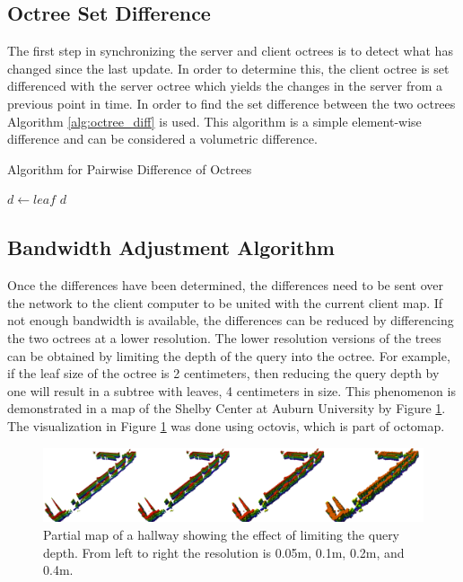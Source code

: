 \documentclass[12pt]{report}
\begin{document}
\subsection{Octree Set Difference}
The first step in synchronizing the server and client octrees is to detect what has changed since the last update. In order to determine this, the client octree is set differenced with the server octree which yields the changes in the server from a previous point in time. In order to find the set difference between the two octrees Algorithm \ref{alg:octree_diff} is used. This algorithm is a simple element-wise difference and can be considered a volumetric difference.

\begin{algorithm}
\caption{Algorithm for Pairwise Difference of Octrees}
\label{alg:octree_diff}
\begin{algorithmic}
  \STATE {}
  \STATE {}
  \STATE {}
      \STATE $d\gets leaf$
    \ENDIF
  \ENDFOR
  \RETURN $d$
\end{algorithmic}
\end{algorithm}

\subsection{Bandwidth Adjustment Algorithm}
Once the differences have been determined, the differences need to be sent over the network to the client computer to be united with the current client map. If not enough bandwidth is available, the differences can be reduced by differencing the two octrees at a lower resolution. The lower resolution versions of the trees can be obtained by limiting the depth of the query into the octree.  For example, if the leaf size of the octree is 2 centimeters, then reducing the query depth by one will result in a subtree with leaves, 4 centimeters in size.  This phenomenon is demonstrated in a map of the Shelby Center at Auburn University by Figure \ref{fig:treedepth}.  The visualization in Figure \ref{fig:treedepth} was done using octovis\cite{octomap}, which is part of octomap.

\begin{figure}[ht]
  \centering
  \includegraphics[width=6in,keepaspectratio]{ShelbySE_2f_combined_octovis.png}
  \caption{Partial map of a hallway showing the effect of limiting the query 
           depth.  From left to right the resolution is 0.05m, 0.1m, 0.2m,
           and 0.4m.}
  \label{fig:treedepth}
\end{figure}
\end{document}
